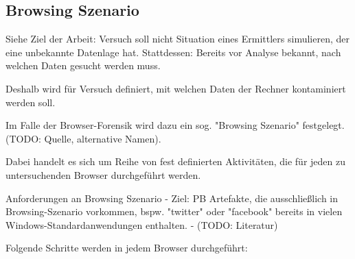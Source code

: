 \subsection{Browsing Szenario}

Siehe Ziel der Arbeit: Versuch soll nicht Situation eines Ermittlers simulieren, der eine unbekannte Datenlage hat.
Stattdessen: Bereits vor Analyse bekannt, nach welchen Daten gesucht werden muss.

Deshalb wird für Versuch definiert, mit welchen Daten der Rechner kontaminiert werden soll.

Im Falle der Browser-Forensik wird dazu ein sog. "Browsing Szenario" festgelegt. (TODO: Quelle, alternative Namen).

Dabei handelt es sich um Reihe von fest definierten Aktivitäten, die für jeden zu untersuchenden Browser durchgeführt werden.

Anforderungen an Browsing Szenario 
- Ziel: PB Artefakte, die ausschließlich in Browsing-Szenario vorkommen, bspw. "twitter" oder "facebook" bereits in vielen Windows-Standardanwendungen enthalten.
- (TODO: Literatur)

Folgende Schritte werden in jedem Browser durchgeführt: 

